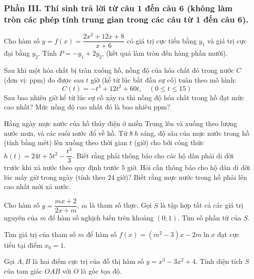 \subsubsection*{Phần III. Thí sinh trả lời từ câu 1 đến câu 6 (không làm tròn các phép tính trung gian trong các câu từ 1 đến câu 6).}
\setcounter{bt}{0}
\begin{baitap}
	Cho hàm số $y = f(x) = \dfrac{2x^2 + 12x + 8}{x + 6}$ có giá trị cực tiểu bằng $y_1$ và giá trị cực đại bằng $y_2$. Tính $P = -y_1 + 2y_2$, (kết quả làm tròn đến hàng phần mười).
\end{baitap}
\begin{baitap}
	Sau khi một hóa chất bị tràn xuống hồ, nồng độ của hóa chất đó trong nước $C$ (đơn vị: $\text{ppm}$) đo được sau $t$ giờ (kể từ lúc bắt đầu sự cố) tuân theo mô hình:
	\[
	C(t) = -t^3 + 12t^2 + 60t,\quad (0 \le t \le 15)
	\]
	Sau bao nhiêu giờ kể từ lúc sự cố xảy ra thì nồng độ hóa chất trong hồ đạt mức cao nhất? Mức nồng độ cao nhất đó là bao nhiêu $\text{ppm}$?
\end{baitap}

\begin{baitap}
	Hằng ngày mực nước của hồ thủy điện ở miền Trung lên và xuống theo lượng nước mưa, và các suối nước đổ về hồ. Từ  $\SI{8}{h}$ sáng, độ sâu của mực nước trong hồ (tính bằng mét) lên xuống theo thời gian $t$ (giờ) cho bởi công thức $h(t) = 24t + 5t^2 - \dfrac{t^3}{3}$. Biết rằng phải thông báo cho các hộ dân phải di dời trước khi xả nước theo quy định trước $5$ giờ. Hỏi cần thông báo cho hộ dân di dời lúc mấy giờ trong ngày (tính theo $24$ giờ)? Biết rằng mực nước trong hồ phải lên cao nhất mới xả nước.
\end{baitap}
\begin{baitap}
	Cho hàm số $y = \dfrac{mx + 2}{2x + m}$, $m$ là tham số thực. Gọi $S$ là tập hợp tất cả các giá trị nguyên của $m$ để hàm số nghịch biến trên khoảng $(0; 1)$. Tìm số phần tử của $S$.
\end{baitap}

\begin{baitap}
	Tìm giá trị của tham số $m$ để hàm số $f(x) = (m^2 - 3)x - 2m \ln x$ đạt cực tiểu tại điểm $x_0 = 1$.
\end{baitap}

\begin{baitap}
	Gọi $A, B$ là hai điểm cực trị của đồ thị hàm số $y = x^3 - 3x^2 + 4$. Tính diện tích $S$ của tam giác $OAB$ với $O$ là gốc tọa độ.
\end{baitap}

